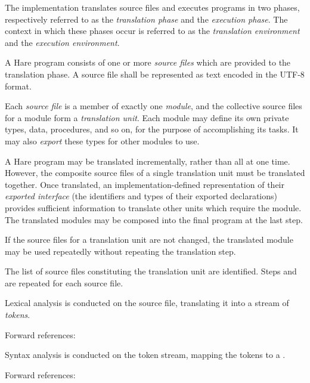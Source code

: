 
\specitem
The implementation translates source files and executes programs in two phases,
respectively referred to as the \textit{translation phase} and the
\textit{execution phase}. The context in which these phases occur is referred
to as the \textit{translation environment} and the \textit{execution
environment}.


\specsubitem
A Hare program consists of one or more \textit{source files} which are provided
to the translation phase. A source file shall be represented as text encoded in
the \hbox{UTF-8} format.

\specsubitem
Each \textit{source file} is a member of exactly one \textit{module}, and the
collective source files for a module form a \textit{translation unit}. Each
module may define its own private types, data, procedures, and so on, for the
purpose of accomplishing its tasks. It may also \textit{export} these types for
other modules to use.

\specsubitem
A Hare program may be translated incrementally, rather than all at one time.
However, the composite source files of a single translation unit must be
translated together. Once translated, an implementation-defined representation
of their \textit{exported interface} (the identifiers and types of their
exported declarations) provides sufficient information to translate other units
which require the module. The translated modules may be composed into the final
program at the last step.

\specsubitem
If the source files for a translation unit are not changed, the translated
module may be used repeatedly without repeating the translation step.


\specsubitem
The list of source files constituting the translation unit are identified. Steps
 and  are
repeated for each source file.

\specsubitem
Lexical analysis is conducted on the source file, translating it into a stream
of \textit{tokens}.

Forward references: 

\specsubitem
Syntax analysis is conducted on the token stream, mapping the tokens to a
.

Forward references: 

